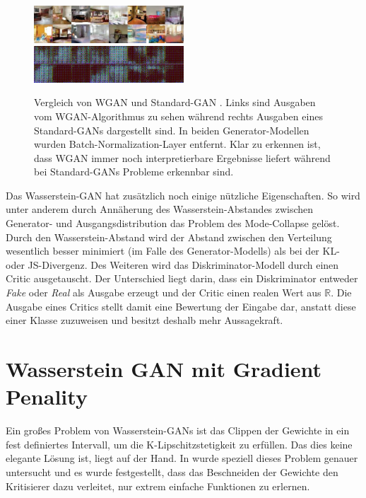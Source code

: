 \documentclass{hsflensburg}
\begin{document}
  \begin{figure}
    \includegraphics[width=0.5\textwidth]{images/image-022.png}
    \includegraphics[width=0.5\textwidth]{images/image-024.png}
    \caption{Vergleich von WGAN und Standard-GAN \cite{arjovsky2017wasserstein}.
      Links sind Ausgaben vom WGAN-Algorithmus zu sehen während rechts Ausgaben
      eines Standard-GANs dargestellt sind. In beiden Generator-Modellen wurden
      Batch-Normalization-Layer entfernt. Klar zu erkennen ist, dass WGAN immer
      noch interpretierbare Ergebnisse liefert während bei Standard-GANs Probleme
      erkennbar sind.}
    \label{fig:wgan-gan-no-batchnorm}
  \end{figure}

  Das Wasserstein-GAN hat zusätzlich noch einige nützliche Eigenschaften. So
  wird unter anderem durch Annäherung des Wasserstein-Abstandes zwischen
  Generator- und Ausgangsdistribution das Problem des Mode-Collapse gelöst.
  Durch den Wasserstein-Abstand wird der Abstand zwischen den Verteilung
  wesentlich besser minimiert (im Falle des Generator-Modells) als bei der KL-
  oder JS-Divergenz.  Des Weiteren wird das Diskriminator-Modell durch einen
  Critic ausgetauscht.  Der Unterschied liegt darin, dass ein Diskriminator
  entweder \textit{Fake} oder \textit{Real} als Ausgabe erzeugt und der Critic
  einen realen Wert aus $\mathbb{R}$. Die Ausgabe eines Critics stellt damit
  eine Bewertung der Eingabe dar, anstatt diese einer Klasse zuzuweisen und
  besitzt deshalb mehr Aussagekraft.

  \section{Wasserstein GAN mit Gradient Penality}
  Ein großes Problem von Wasserstein-GANs ist das Clippen der Gewichte in ein
  fest definiertes Intervall, um die K-Lipschitzstetigkeit zu erfüllen. Das dies
  keine elegante Lösung ist, liegt auf der Hand. In \cite{gulrajani2017improved}
  wurde speziell dieses Problem genauer untersucht und es wurde festgestellt,
  dass das Beschneiden der Gewichte den Kritisierer dazu verleitet, nur extrem
  einfache Funktionen zu erlernen.
\end{document}
